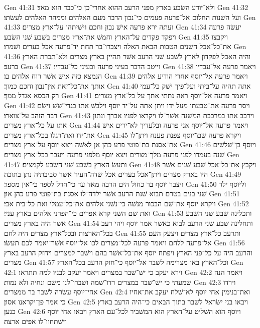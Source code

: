 Gen 41:31  ולא־יודע השׂבע בארץ מפני הרעב ההוא אחרי־כן כי־כבד הוא מאד׃
Gen 41:32  ועל השׁנות החלום אל־פרעה פעמים כי־נכון הדבר מעם האלהים וממהר האלהים לעשׂתו׃
Gen 41:33  ועתה ירא פרעה אישׁ נבון וחכם וישׁיתהו על־ארץ מצרים׃
Gen 41:34  יעשׂה פרעה ויפקד פקדים על־הארץ וחמשׁ את־ארץ מצרים בשׁבע שׁני השׂבע׃
Gen 41:35  ויקבצו את־כל־אכל השׁנים הטבות הבאת האלה ויצברו־בר תחת יד־פרעה אכל בערים ושׁמרו׃
Gen 41:36  והיה האכל לפקדון לארץ לשׁבע שׁני הרעב אשׁר תהיין בארץ מצרים ולא־תכרת הארץ ברעב׃
Gen 41:37  וייטב הדבר בעיני פרעה ובעיני כל־עבדיו׃
Gen 41:38  ויאמר פרעה אל־עבדיו הנמצא כזה אישׁ אשׁר רוח אלהים בו׃
Gen 41:39  ויאמר פרעה אל־יוסף אחרי הודיע אלהים אותך את־כל־זאת אין־נבון וחכם כמוך׃
Gen 41:40  אתה תהיה על־ביתי ועל־פיך ישׁק כל־עמי רק הכסא אגדל ממך׃
Gen 41:41  ויאמר פרעה אל־יוסף ראה נתתי אתך על כל־ארץ מצרים׃
Gen 41:42  ויסר פרעה את־טבעתו מעל ידו ויתן אתה על־יד יוסף וילבשׁ אתו בגדי־שׁשׁ וישׂם רבד הזהב על־צוארו׃
Gen 41:43  וירכב אתו במרכבת המשׁנה אשׁר־לו ויקראו לפניו אברך ונתון אתו על כל־ארץ מצרים׃
Gen 41:44  ויאמר פרעה אל־יוסף אני פרעה ובלעדיך לא־ירים אישׁ את־ידו ואת־רגלו בכל־ארץ מצרים׃
Gen 41:45  ויקרא פרעה שׁם־יוסף צפנת פענח ויתן־לו את־אסנת בת־פוטי פרע כהן אן לאשׁה ויצא יוסף על־ארץ מצרים׃
Gen 41:46  ויוסף בן־שׁלשׁים שׁנה בעמדו לפני פרעה מלך־מצרים ויצא יוסף מלפני פרעה ויעבר בכל־ארץ מצרים׃
Gen 41:47  ותעשׂ הארץ בשׁבע שׁני השׂבע לקמצים׃
Gen 41:48  ויקבץ את־כל־אכל שׁבע שׁנים אשׁר היו בארץ מצרים ויתן־אכל בערים אכל שׂדה־העיר אשׁר סביבתיה נתן בתוכה׃
Gen 41:49  ויצבר יוסף בר כחול הים הרבה מאד עד כי־חדל לספר כי־אין מספר׃
Gen 41:50  וליוסף ילד שׁני בנים בטרם תבוא שׁנת הרעב אשׁר ילדה־לו אסנת בת־פוטי פרע כהן און׃
Gen 41:51  ויקרא יוסף את־שׁם הבכור מנשׁה כי־נשׁני אלהים את־כל־עמלי ואת כל־בית אבי׃
Gen 41:52  ואת שׁם השׁני קרא אפרים כי־הפרני אלהים בארץ עניי׃
Gen 41:53  ותכלינה שׁבע שׁני השׂבע אשׁר היה בארץ מצרים׃
Gen 41:54  ותחלינה שׁבע שׁני הרעב לבוא כאשׁר אמר יוסף ויהי רעב בכל־הארצות ובכל־ארץ מצרים היה לחם׃
Gen 41:55  ותרעב כל־ארץ מצרים ויצעק העם אל־פרעה ללחם ויאמר פרעה לכל־מצרים לכו אל־יוסף אשׁר־יאמר לכם תעשׂו׃
Gen 41:56  והרעב היה על כל־פני הארץ ויפתח יוסף את־כל־אשׁר בהם וישׁבר למצרים ויחזק הרעב בארץ מצרים׃
Gen 41:57  וכל־הארץ באו מצרימה לשׁבר אל־יוסף כי־חזק הרעב בכל־הארץ׃
Gen 42:1  וירא יעקב כי ישׁ־שׁבר במצרים ויאמר יעקב לבניו למה תתראו׃
Gen 42:2  ויאמר הנה שׁמעתי כי ישׁ־שׁבר במצרים רדו־שׁמה ושׁברו־לנו משׁם ונחיה ולא נמות׃
Gen 42:3  וירדו אחי־יוסף עשׂרה לשׁבר בר ממצרים׃
Gen 42:4  ואת־בנימין אחי יוסף לא־שׁלח יעקב את־אחיו כי אמר פן־יקראנו אסון׃
Gen 42:5  ויבאו בני ישׂראל לשׁבר בתוך הבאים כי־היה הרעב בארץ כנען׃
Gen 42:6  ויוסף הוא השׁליט על־הארץ הוא המשׁביר לכל־עם הארץ ויבאו אחי יוסף וישׁתחוו־לו אפים ארצה׃
